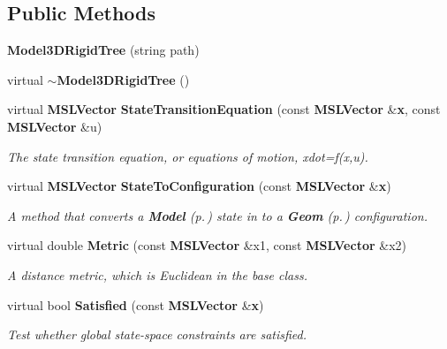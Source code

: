 \subsection*{Public Methods}
\begin{CompactItemize}
\item 
{\bf Model3DRigid\-Tree} (string path)
\item 
virtual {\bf $\sim$Model3DRigid\-Tree} ()
\item 
virtual {\bf MSLVector} {\bf State\-Transition\-Equation} (const {\bf MSLVector} \&{\bf x}, const {\bf MSLVector} \&u)
\begin{CompactList}\small\item\em The state transition equation, or equations of motion, xdot=f(x,u).\item\end{CompactList}\item 
virtual {\bf MSLVector} {\bf State\-To\-Configuration} (const {\bf MSLVector} \&{\bf x})
\begin{CompactList}\small\item\em A method that converts a {\bf Model} {\rm (p.\,\pageref{classModel})} state in to a {\bf Geom} {\rm (p.\,\pageref{classGeom})} configuration.\item\end{CompactList}\item 
virtual double {\bf Metric} (const {\bf MSLVector} \&x1, const {\bf MSLVector} \&x2)
\begin{CompactList}\small\item\em A distance metric, which is Euclidean in the base class.\item\end{CompactList}\item 
virtual bool {\bf Satisfied} (const {\bf MSLVector} \&{\bf x})
\begin{CompactList}\small\item\em Test whether global state-space constraints are satisfied.\item\end{CompactList}\end{CompactItemize}

